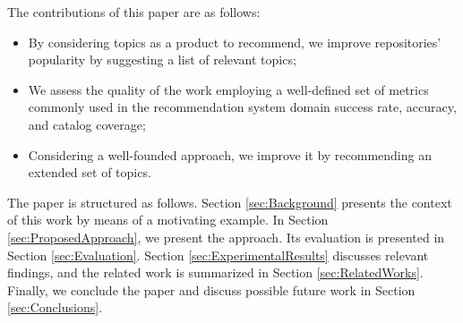 
The contributions of this paper are as follows:
\begin{itemize}
	\item By considering \GH topics as a product to recommend, we improve 
	repositories' popularity by suggesting a list of relevant topics;
	\item We assess the quality of the work employing a well-defined set of 
	metrics commonly used in the recommendation system domain \ie success rate, 
	accuracy, and catalog coverage;
	\item Considering a well-founded approach, we improve it by recommending an 
	extended set of topics.  
\end{itemize}

The paper is structured as follows. Section \ref{sec:Background} presents the 
context of this work by means of a motivating example. In Section 
\ref{sec:ProposedApproach}, we present the \TF approach. Its evaluation is  
presented in Section \ref{sec:Evaluation}. Section 
\ref{sec:ExperimentalResults} discusses relevant findings, and the related work is 
summarized in  Section \ref{sec:RelatedWorks}. Finally, we conclude the paper 
and discuss possible future work in Section \ref{sec:Conclusions}.
